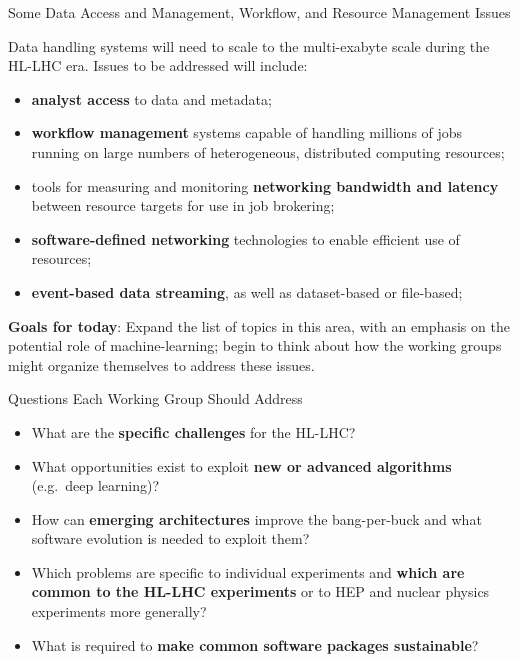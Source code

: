 \documentclass[compress,10]{beamer}
\begin{document}
\begin{frame}{Some Data Access and Management, Workflow,
and Resource Management Issues}{}
{\footnotesize
Data handling systems will need to scale to the multi-exabyte scale during
the HL-LHC era.
Issues to be addressed will include:
\begin{itemize}
 \item
  \textcolor{brickred}{\bf analyst access} to data and metadata;
 \item
  \textcolor{brickred}{\bf workflow management}
   systems capable of handling millions of jobs
  running on large numbers of heterogeneous, distributed computing resources;
 \item
  tools for measuring and monitoring \textcolor{brickred}{\bf networking 
  bandwidth and latency} between
  resource targets for use in job brokering;
 \item
  \textcolor{brickred}{\bf
  software-defined networking} technologies to enable efficient use of 
  resources;
 \item
  \textcolor{brickred}{\bf event-based data streaming}, 
   as well as dataset-based or file-based;
\end{itemize}
\vskip 0.1in
\noindent
\textcolor{brickred}{\bf Goals for today}: 
Expand the list of topics in this area, with an emphasis
on the potential role of machine-learning; 
begin to think about how
the working groups might organize themselves to address these issues.
}  %

\end{frame}
\begin{frame}{
Questions Each Working Group Should Address}{}
{\footnotesize
\begin{itemize}
\item
  What are the \textcolor{brickred}{\bf specific challenges} for the
  HL-LHC?
\item
  What opportunities exist to exploit \textcolor{brickred}{\bf new or advanced
  algorithms} (e.g.\ deep learning)?
\item
  How can \textcolor{brickred}{\bf emerging architectures}
   improve the bang-per-buck and what
  software evolution is needed to exploit them?
\item
  Which problems are specific to individual experiments and 
  \textcolor{brickred}{\bf which
  are common to the HL-LHC experiments} or to HEP
  and nuclear physics experiments
  more generally?
\item
  What is required to 
  \textcolor{brickred}{\bf make common software packages sustainable}?
\end{itemize}
}  %

\end{frame}
\end{document}

